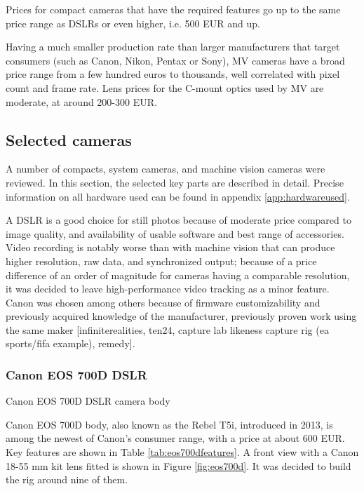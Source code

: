 Prices for compact cameras that have the required features go up to the same price range as DSLRs or even higher, i.e. 500 EUR and up.

Having a much smaller production rate than larger manufacturers that target consumers (such as Canon, Nikon, Pentax or Sony), MV cameras have a broad price range from a few hundred euros to thousands, well correlated with pixel count and frame rate.
Lens prices for the C-mount optics used by MV are moderate, at around 200-300 EUR.


\subsection{Selected cameras} %

A number of compacts, system cameras, and machine vision cameras were reviewed.
In this section, the selected key parts are described in detail.
Precise information on all hardware used can be found in appendix \ref{app:hardwareused}.

A DSLR is a good choice for still photos because of moderate price compared to image quality, and availability of usable software and best range of accessories.
Video recording is notably worse than with machine vision that can produce higher resolution, raw data, and synchronized output;
because of a price difference of an order of magnitude for cameras having a comparable resolution, it was decided to leave high-performance video tracking as a minor feature.
Canon was chosen among others because of firmware customizability \cite{magiclantern} and previously acquired knowledge of the manufacturer, previously proven work using the same maker [infiniterealities, ten24, capture lab likeness capture rig (ea sports/fifa example), remedy].

\subsubsection{Canon EOS 700D DSLR}

{Canon EOS 700D DSLR camera body}

Canon EOS 700D body, also known as the Rebel T5i, introduced in 2013, is among the newest of Canon's consumer range, with a price at about 600 EUR.
Key features are shown in Table \ref{tab:eos700dfeatures}.
A front view with a Canon 18-55 mm kit lens fitted is shown in Figure \ref{fig:eos700d}.
It was decided to build the rig around nine of them.

